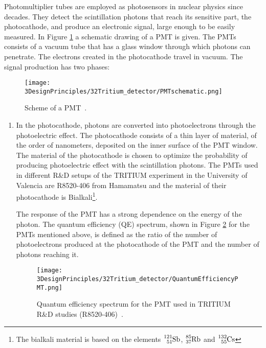 Photomultiplier tubes are employed as photosensors in nuclear physics since decades. They detect the scintillation photons that reach its sensitive part, the photocathode, and produce an electronic signal, large enough to be easily measured. In Figure \ref{fig:SchemePMT} a schematic drawing of a PMT is given. The PMTs consists of a vacuum tube that has a glass window through which photons can penetrate. The electrons created in the photocathode travel in vacuum. The signal production has two phases:

\begin{figure}[htbp]
\centering
\texttt{[image: 3DesignPrinciples/32Tritium\_detector/PMTschematic.png]}
\caption{Scheme of a PMT\label{fig:SchemePMT}~\cite{Knoll}.}
\end{figure}

\begin{enumerate}
\item{} In the photocathode, photons are converted into photoelectrons through the photoelectric effect. The photocathode consists of a thin layer of material, of the order of nanometers, deposited on the inner surface of the PMT window. The material of the photocathode is chosen to optimize the probability of producing photoelectric effect with the scintillation photons. The PMTs used in different R\&D setups of the TRITIUM experiment in the University of Valencia are R8520-406 from Hamamatsu \cite{DataSheetPMTs} and the material of their photocathode is Bialkali\footnote{The bialkali material is based on the elements $\ce{^{121}_{51}Sb}$, $\ce{^{85}_{37}Rb}$ and $\ce{^{132}_{55}Cs}$}.


The response of the PMT has a strong dependence on the energy of the photon. The quantum efficiency (QE)  spectrum, shown in Figure \ref{fig:QuantumEfficiencyPMT} for the PMTs mentioned above, is defined as the ratio of the number of photoelectrons produced at the photocathode of the PMT and the number of photons reaching it.

\begin{figure}[htbp]
\centering
\texttt{[image: 3DesignPrinciples/32Tritium\_detector/QuantumEfficiencyPMT.png]}
\caption{Quantum efficiency spectrum for the PMT used in TRITIUM R\&D studies (R8520-406)\label{fig:QuantumEfficiencyPMT}~\cite{DataSheetPMTs}.}
\end{figure}


\end{enumerate}
